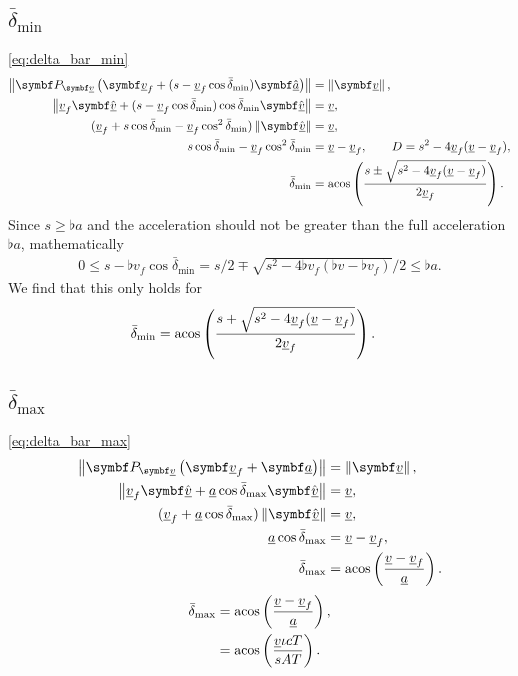 \subsection{\texorpdfstring{$\bar{\delta}_{\min}$}{bar delta\_min}}
\eqref{eq:delta_bar_min}
\begin{align*}
\norm{\projmat{\flat{v}} \left( \vec{\flat{v}}_f + (s - \flat{v}_f \cos\bar{\delta}_{\min})\uvec{\flat{a}} \right)} &= \norm{\vec{\flat{v}}},\\
\norm{\flat{v}_f \uvec{\flat{v}} + (s - \flat{v}_f \cos\bar{\delta}_{\min})\cos\bar{\delta}_{\min}\uvec{\flat{v}}} &= \flat{v},\\
(\flat{v}_f + s\cos\bar{\delta}_{\min} - \flat{v}_f \cos^2\bar{\delta}_{\min}) \norm{\uvec{\flat{v}}} &= \flat{v},\\
s\cos\bar{\delta}_{\min} - \flat{v}_f \cos^2\bar{\delta}_{\min} &= \flat{v} - \flat{v}_f, \qquad D = s^2 - 4 \flat{v}_f (\flat{v} - \flat{v}_f),\\
\bar{\delta}_{\min} &= \acos\left( \frac{s \pm \sqrt{s^2 - 4 \flat{v}_f (\flat{v} - \flat{v}_f)}}{2 \flat{v}_f} \right).\\
\end{align*}
Since $s \ge \flat{a}$ and the acceleration should not be greater than the full acceleration $\flat{a}$, mathematically
\begin{align*}
0 \le s - \flat{v}_f \cos\bar{\delta}_{\min} = s / 2 \mp \sqrt{s^2 - 4 \flat{v}_f (\flat{v} - \flat{v}_f)} \Big/ 2 \le \flat{a}.
\end{align*}
We find that this only holds for
\begin{align*}
\bar{\delta}_{\min} &= \acos\left( \frac{s + \sqrt{s^2 - 4 \flat{v}_f (\flat{v} - \flat{v}_f)}}{2 \flat{v}_f} \right).
\end{align*}


\subsection{\texorpdfstring{$\bar{\delta}_{\max}$}{bar delta\_max}}
\eqref{eq:delta_bar_max}
\begin{align*}
\norm{\projmat{\flat{v}}\left( \vec{\flat{v}}_f + \vec{\flat{a}} \right)} &= \norm{\vec{\flat{v}}},\\
\norm{\flat{v}_f \uvec{\flat{v}} + \flat{a} \cos\bar{\delta}_{\max}\uvec{\flat{v}}} &= \flat{v},\\
(\flat{v}_f + \flat{a} \cos\bar{\delta}_{\max}) \norm{\uvec{\flat{v}}} &= \flat{v},\\
\flat{a} \cos\bar{\delta}_{\max} &= \flat{v} - \flat{v}_f,\\
\bar{\delta}_{\max} &= \acos\left( \frac{\flat{v} - \flat{v}_f}{\flat{a}} \right).
\end{align*}
\begin{align*}
\bar{\delta}_{\max} &= \acos\left( \frac{\flat{v} - \flat{v}_f}{\flat{a}} \right),\\
&= \acos\left( \frac{\flat{v} \iota cT}{sAT} \right).
\end{align*}

